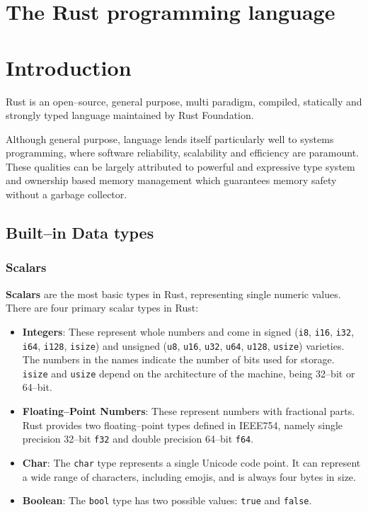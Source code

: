 
\chapter{The Rust programming language}

\chapter*{Introduction}

Rust is an open--source, general purpose, multi paradigm, compiled, statically and strongly typed language maintained by Rust Foundation.

Although general purpose, language lends itself particularly well to systems programming, where software reliability, scalability and efficiency are paramount.
These qualities can be largely attributed to powerful and expressive type system and ownership based memory management which guarantees memory safety without a garbage collector.

\section{Built--in Data types}

\subsection{Scalars}
\textbf{Scalars} are the most basic types in Rust, representing single numeric values. There are four primary scalar types in Rust:

\begin{itemize}
    \item \textbf{Integers}: These represent whole numbers and come in signed (\texttt{i8}, \texttt{i16}, \texttt{i32}, \texttt{i64}, \texttt{i128}, \texttt{isize}) 
    and unsigned (\texttt{u8}, \texttt{u16}, \texttt{u32}, \texttt{u64}, \texttt{u128}, \texttt{usize}) varieties. 
    The numbers in the names indicate the number of bits used for storage. \texttt{isize} and \texttt{usize} depend on the architecture of the machine, being 32--bit or 64--bit.
    
    \item \textbf{Floating--Point Numbers}: These represent numbers with fractional parts. Rust provides two floating--point types defined in IEEE754, namely single precision 32--bit \texttt{f32} and double precision 64--bit \texttt{f64}.
    
    \item \textbf{Char}: The \texttt{char} type represents a single Unicode code point. It can represent a wide range of characters, including emojis, and is always four bytes in size.
    
    \item \textbf{Boolean}: The \texttt{bool} type has two possible values: \texttt{true} and \texttt{false}.
\end{itemize}

